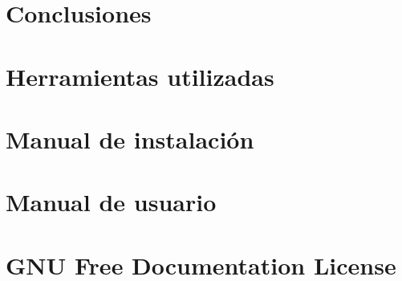 \documentclass[a4paper,12pt]{scrbook}
\begin{document}
\chapter{Conclusiones}
\label{chap:conclusiones}
%

\appendix

\chapter{Herramientas utilizadas}
\label{chap:herramientas}
%

\chapter{Manual de instalación}
\label{chap:manual_instalacion}
%

\chapter{Manual de usuario}
\label{chap:manual_usuario}
%

\chapter{GNU Free Documentation License}
\label{sec:fdl}




\end{document}
